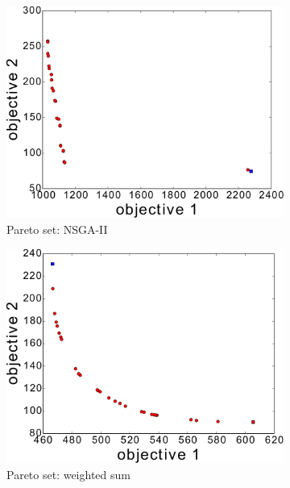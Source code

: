\documentclass{article}
\begin{document}
\begin{figure}[h!]
\begin{subfigure}[b]{0.3\linewidth}
		\includegraphics[width=\textwidth]{fig/sim3-2obj/PF03-MOPATH.pdf}
		\caption{Pareto set: NSGA-II}
		\label{fig:sim:norm:pf:a}
	\end{subfigure}
	\begin{subfigure}[b]{0.3\linewidth}
		\centering
		\includegraphics[width=\textwidth]{fig/sim1-2obj/PF01-MORRT.pdf}
		\caption{Pareto set: weighted sum}
		\label{fig:sim:norm:pf:b}
	\end{subfigure}
	\begin{subfigure}[b]{0.3\linewidth}
		\centering

\end{subfigure}
\end{figure}
\end{document}
